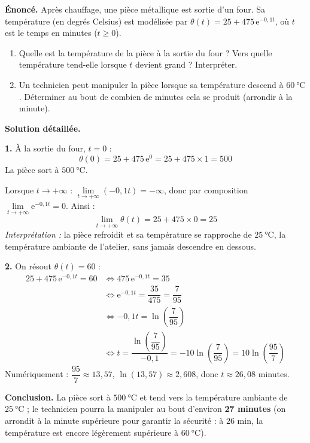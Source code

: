 \documentclass[11pt]{article}
\begin{document}
\begin{exoresolu}
\textbf{Énoncé.} Après chauffage, une pièce métallique est sortie d'un four. Sa température (en degrés Celsius) est modélisée par $\theta(t) = 25 + 475\,\mathrm{e}^{-0{,}1t}$, où $t$ est le temps en minutes ($t \geq 0$).
\begin{enumerate}
\item Quelle est la température de la pièce à la sortie du four ? Vers quelle température tend-elle lorsque $t$ devient grand ? Interpréter.
\item Un technicien peut manipuler la pièce lorsque sa température descend à $\SI{60}{\celsius}$. Déterminer au bout de combien de minutes cela se produit (arrondir à la minute).
\end{enumerate}
\tcblower
\textbf{Solution détaillée.}

\textbf{1.} À la sortie du four, $t = 0$ :
\[ \theta(0) = 25 + 475\,\mathrm{e}^{0} = 25 + 475 \times 1 = 500 \]
La pièce sort à $\SI{500}{\celsius}$.

Lorsque $t \to +\infty$ : $\lim\limits_{t \to +\infty} (-0{,}1t) = -\infty$, donc par composition $\lim\limits_{t \to +\infty} \mathrm{e}^{-0{,}1t} = 0$. Ainsi :
\[ \lim_{t \to +\infty} \theta(t) = 25 + 475 \times 0 = 25 \]
\emph{Interprétation :} la pièce refroidit et sa température se rapproche de $\SI{25}{\celsius}$, la température ambiante de l'atelier, sans jamais descendre en dessous.

\textbf{2.} On résout $\theta(t) = 60$ :
\begin{align*}
25 + 475\,\mathrm{e}^{-0{,}1t} = 60 &\iff 475\,\mathrm{e}^{-0{,}1t} = 35 \\
&\iff \mathrm{e}^{-0{,}1t} = \dfrac{35}{475} = \dfrac{7}{95} \\
&\iff -0{,}1t = \ln\left(\dfrac{7}{95}\right) \\
&\iff t = \dfrac{\ln\left(\dfrac{7}{95}\right)}{-0{,}1} = -10\ln\left(\dfrac{7}{95}\right) = 10\ln\left(\dfrac{95}{7}\right)
\end{align*}
Numériquement : $\dfrac{95}{7} \approx 13{,}57$, $\ln(13{,}57) \approx 2{,}608$, donc $t \approx 26{,}08$ minutes.

\textbf{Conclusion.} La pièce sort à $\SI{500}{\celsius}$ et tend vers la température ambiante de $\SI{25}{\celsius}$ ; le technicien pourra la manipuler au bout d'environ \textbf{27 minutes} (on arrondit à la minute supérieure pour garantir la sécurité : à $26$ min, la température est encore légèrement supérieure à $\SI{60}{\celsius}$).
\end{exoresolu}
\end{document}
